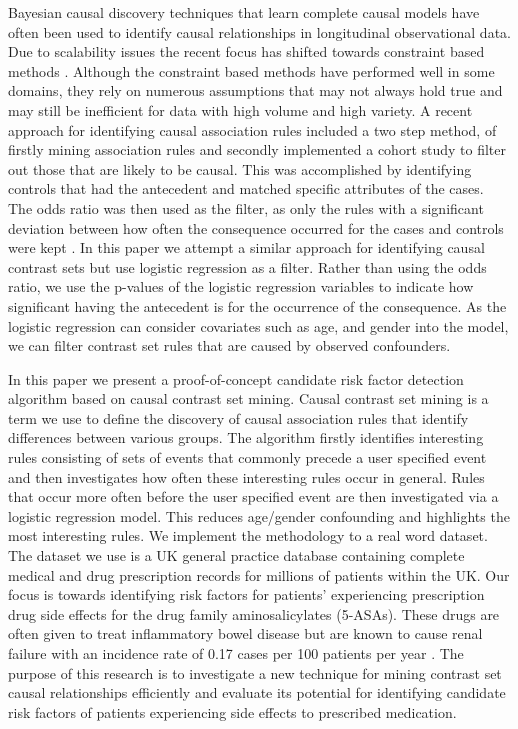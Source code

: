 \documentclass{llncs}
\begin{document}
Bayesian causal discovery techniques that learn complete causal models have often been used to identify causal relationships in longitudinal observational data\cite{cooper1992bayesian}. Due to scalability issues the recent focus has shifted towards constraint based methods \cite{silverstein2000scalable}. Although the constraint based methods have performed well in some domains, they rely on numerous assumptions \cite{heckerman1999bayesian} that may not always hold true and may still be inefficient for data with high volume and high variety. A recent approach for identifying causal association rules included a two step method, of firstly mining association rules and secondly implemented a cohort study to filter out those that are likely to be causal. This was accomplished by identifying controls that had the antecedent and matched specific attributes of the cases. The odds ratio was then used as the filter, as only the rules with a significant deviation between how often the consequence occurred for the cases and controls were kept \cite{li2013mining}. In this paper we attempt a similar approach for identifying causal contrast sets but use logistic regression as a filter. Rather than using the odds ratio, we use the p-values of the logistic regression variables to indicate how significant having the antecedent is for the occurrence of the consequence. As the logistic regression can consider covariates such as age, and gender into the model, we can filter contrast set rules that are caused by observed confounders. 

In this paper we present a proof-of-concept candidate risk factor detection algorithm based on causal contrast set mining. Causal contrast set mining is a term we use to define the discovery of causal association rules that identify differences between various groups. The algorithm firstly identifies interesting rules consisting of sets of events that commonly precede a user specified event and then investigates how often these interesting rules occur in general. Rules that occur more often before the user specified event are then investigated via a logistic regression model. This reduces age/gender confounding and highlights the most interesting rules. We implement the methodology to a real word dataset. The dataset we use is a UK general practice database containing complete medical and drug prescription records for millions of patients within the UK. Our focus is towards identifying risk factors for patients' experiencing prescription drug side effects for the drug family aminosalicylates (5-ASAs). These drugs are often given to treat inflammatory bowel disease but are known to cause renal failure with an incidence rate of 0.17 cases per 100 patients per year \cite{van20045}. The purpose of this research is to investigate a new technique for mining contrast set causal relationships efficiently and evaluate its potential for identifying candidate risk factors of patients experiencing side effects to prescribed medication.
\end{document}
